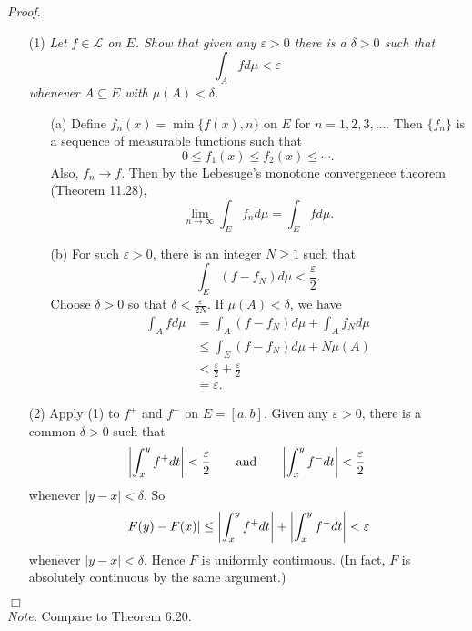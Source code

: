 \documentclass{article}
\begin{document}
\emph{Proof.}
\begin{enumerate}
\item[(1)]
  \emph{Let $f \in \mathscr{L}$ on $E$.
  Show that given any $\varepsilon > 0$ there is a $\delta > 0$ such that
  \[
    \int_{A} f d\mu < \varepsilon
  \]
  whenever $A \subseteq E$ with $\mu(A) < \delta$.}
  \begin{enumerate}
  \item[(a)]
    Define $f_n(x) = \min\{ f(x), n \}$ on $E$ for $n=1,2,3,\ldots$.
    Then $\{f_n\}$ is a sequence of measurable functions such that
    \[
      0 \leq f_1(x) \leq f_2(x) \leq \cdots.
    \]
    Also, $f_n \to f$.
    Then by the Lebesuge's monotone convergenece theorem (Theorem 11.28),
    \[
      \lim_{n \to \infty} \int_{E} f_n d\mu = \int_{E} f d\mu.
    \]

  \item[(b)]
    For such $\varepsilon > 0$, there is an integer $N \geq 1$ such that
    \[
      \int_{E} (f - f_N) d\mu < \frac{\varepsilon}{2}.
    \]
    Choose $\delta > 0$ so that $\delta < \frac{\varepsilon}{2N}$.
    If $\mu(A) < \delta$, we have
    \begin{align*}
      \int_{A} f d\mu
      &= \int_{A} (f-f_N) d\mu + \int_{A} f_N d\mu \\
      &\leq \int_{E} (f-f_N) d\mu + N \mu(A) \\
      &< \frac{\varepsilon}{2} + \frac{\varepsilon}{2} \\
      &= \varepsilon.
    \end{align*}
  \end{enumerate}

\item[(2)]
  Apply (1) to $f^{+}$ and $f^{-}$ on $E = [a,b]$.
  Given any $\varepsilon > 0$, there is a common $\delta > 0$
  such that
  \[
    \abs{ \int_{x}^{y} f^{+} dt } < \frac{\varepsilon}{2}
    \qquad \text{and} \qquad
    \abs{ \int_{x}^{y} f^{-} dt } < \frac{\varepsilon}{2}
  \]
  whenever $|y - x| < \delta$.
  So
  \[
    \abs{ F(y) - F(x) }
    \leq \abs{\int_{x}^{y} f^{+} dt} + \abs{\int_{x}^{y} f^{-} dt}
    < \varepsilon
  \]
  whenever $|y - x| < \delta$.
  Hence $F$ is uniformly continuous.
  (In fact, $F$ is absolutely continuous by the same argument.)
\end{enumerate}
$\Box$ \\

\emph{Note.}
Compare to Theorem 6.20. \\\\
\end{document}
